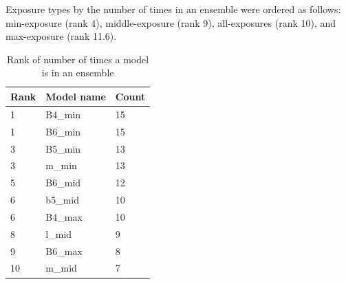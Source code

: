 \documentclass[10pt,letterpaper]{article}
\begin{document}
Exposure types by the number of times in an ensemble were ordered as follows: min-exposure (rank 4), middle-exposure (rank 9), all-exposures (rank 10), and max-exposure (rank 11.6).

\begin{center}
\begin{table}[hbt!]
\caption{Rank of number of times a model is in an ensemble}
\begin{tabular}{ |l|l|l| }
\hline
Rank & Model name & Count   \\ \hline
        1 & B4\_min & 15 \\ \hline
        1 & B6\_min & 15 \\ \hline
        3 & B5\_min & 13 \\ \hline
        3 & m\_min & 13 \\ \hline
        5 & B6\_mid & 12 \\ \hline
        6 & b5\_mid & 10 \\ \hline
        6 & B4\_max & 10 \\ \hline
        8 & l\_mid & 9 \\ \hline
        9 & B6\_max & 8 \\ \hline
        10 & m\_mid & 7 \\ \hline
\end{tabular}
\label{table8}
\end{table}
\end{center}
\end{document}
